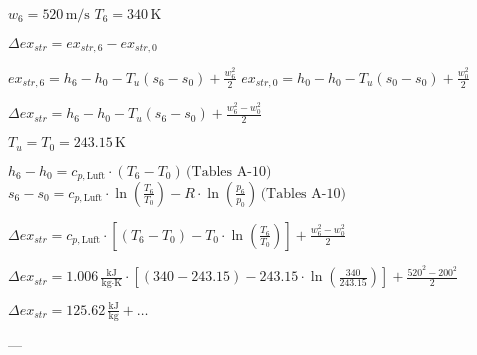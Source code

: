 \( w_6 = 520 \, \text{m/s} \)  
\( T_6 = 340 \, \text{K} \)  

\( \Delta ex_{str} = ex_{str,6} - ex_{str,0} \)  

\( ex_{str,6} = h_6 - h_0 - T_u (s_6 - s_0) + \frac{w_6^2}{2} \)  
\( ex_{str,0} = h_0 - h_0 - T_u (s_0 - s_0) + \frac{w_0^2}{2} \)  

\( \Delta ex_{str} = h_6 - h_0 - T_u (s_6 - s_0) + \frac{w_6^2 - w_0^2}{2} \)  

\( T_u = T_0 = 243.15 \, \text{K} \)  

\( h_6 - h_0 = c_{p,\text{Luft}} \cdot (T_6 - T_0) \, \text{(Tables A-10)} \)  
\( s_6 - s_0 = c_{p,\text{Luft}} \cdot \ln \left( \frac{T_6}{T_0} \right) - R \cdot \ln \left( \frac{p_6}{p_0} \right) \, \text{(Tables A-10)} \)  

\( \Delta ex_{str} = c_{p,\text{Luft}} \cdot \left[ (T_6 - T_0) - T_0 \cdot \ln \left( \frac{T_6}{T_0} \right) \right] + \frac{w_6^2 - w_0^2}{2} \)  

\( \Delta ex_{str} = 1.006 \, \frac{\text{kJ}}{\text{kg·K}} \cdot \left[ (340 - 243.15) - 243.15 \cdot \ln \left( \frac{340}{243.15} \right) \right] + \frac{520^2 - 200^2}{2} \)  

\( \Delta ex_{str} = 125.62 \, \frac{\text{kJ}}{\text{kg}} + \dots \)  

---